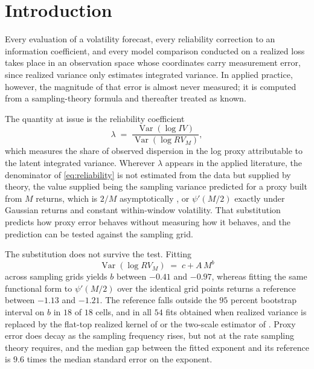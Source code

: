 \section{Introduction}\label{sec:intro}

Every evaluation of a volatility forecast, every reliability correction to an
information coefficient, and every model comparison conducted on a realized loss
\citep{patton2011,hln2011} takes place in an observation space whose coordinates
carry measurement error, since realized variance only estimates integrated
variance. In applied practice, however, the magnitude of that error is almost
never measured; it is computed from a sampling-theory formula and thereafter
treated as known.

The quantity at issue is the reliability coefficient
\begin{equation}\label{eq:reliability}
\lambda \;=\; \frac{\operatorname{Var}\!\left(\log IV\right)}
                   {\operatorname{Var}\!\left(\log RV_M\right)},
\end{equation}
which measures the share of observed dispersion in the log proxy attributable to
the latent integrated variance. Wherever $\lambda$ appears in the applied
literature, the denominator of \eqref{eq:reliability} is not estimated from the
data but supplied by theory, the value supplied being the sampling variance
predicted for a proxy built from $M$ returns, which is $2/M$
asymptotically \citep{bns2002}, or $\psi'(M/2)$ exactly under Gaussian returns
and constant within-window volatility. That substitution predicts how proxy error
behaves without measuring how it behaves, and the prediction can be tested
against the sampling grid.

The substitution does not survive the test. Fitting
\begin{equation}\label{eq:scaling0}
\operatorname{Var}\!\left(\log RV_M\right) \;=\; c + A\,M^{b}
\end{equation}
across sampling grids yields $b$ between $-0.41$ and $-0.97$, whereas fitting the %
same functional form to $\psi'(M/2)$ over the identical grid points returns a
reference between $-1.13$ and $-1.21$. The reference falls outside the $95$ %
percent bootstrap interval on $b$ in $18$ of $18$ cells, and in all $54$ fits %
obtained when realized variance is replaced by the flat-top realized kernel of
\citet{bnhls2008} or the two-scale estimator of \citet{zma2005}. %
Proxy error does decay as the sampling frequency rises, but not at the rate
sampling theory requires, and the median gap between the fitted exponent and its
reference is $9.6$ times the median standard error on the exponent. %

